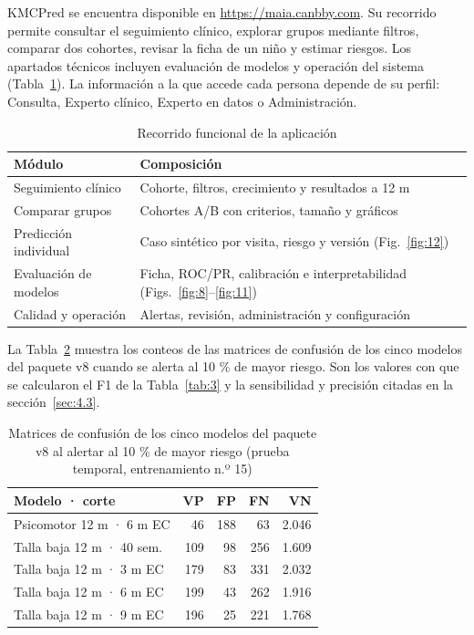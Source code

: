 KMCPred se encuentra disponible en \url{https://maia.canbby.com}. Su recorrido permite consultar el seguimiento clínico, explorar grupos mediante filtros, comparar dos cohortes, revisar la ficha de un niño y estimar riesgos. Los apartados técnicos incluyen evaluación de modelos y operación del sistema (Tabla~\ref{tab:6}). La información a la que accede cada persona depende de su perfil: Consulta, Experto clínico, Experto en datos o Administración.

\begin{table}[t]
\centering
\caption{Recorrido funcional de la aplicación}
\label{tab:6}
\footnotesize
\setlength{\tabcolsep}{2pt}
\begin{tabular}{@{}p{}p{}@{}}
\toprule
\textbf{Módulo} & \textbf{Composición} \\
\midrule
Seguimiento clínico & Cohorte, filtros, crecimiento y resultados a 12 m \\
Comparar grupos & Cohortes A/B con criterios, tamaño y gráficos \\
Predicción individual & Caso sintético por visita, riesgo y versión (Fig.~\ref{fig:12}) \\
Evaluación de modelos & Ficha, ROC/PR, calibración e interpretabilidad (Figs.~\ref{fig:8}--\ref{fig:11}) \\
Calidad y operación & Alertas, revisión, administración y configuración \\
\bottomrule
\end{tabular}
\end{table}

La Tabla~\ref{tab:7} muestra los conteos de las matrices de confusión de los cinco modelos del paquete v8 cuando se alerta al 10 \% de mayor riesgo. Son los valores con que se calcularon el F1 de la Tabla~\ref{tab:3} y la sensibilidad y precisión citadas en la sección~\ref{sec:4.3}.

\begin{table}[t]
\centering
\caption{Matrices de confusión de los cinco modelos del paquete v8 al alertar al 10 \% de mayor riesgo (prueba temporal, entrenamiento n.º 15)}
\label{tab:7}
\footnotesize
\setlength{\tabcolsep}{2pt}
\begin{tabular}{@{}lrrrr@{}}
\toprule
\textbf{Modelo · corte} & \textbf{VP} & \textbf{FP} & \textbf{FN} & \textbf{VN} \\
\midrule
Psicomotor 12 m · 6 m EC & 46 & 188 & 63 & 2.046 \\
Talla baja 12 m · 40 sem. & 109 & 98 & 256 & 1.609 \\
Talla baja 12 m · 3 m EC & 179 & 83 & 331 & 2.032 \\
Talla baja 12 m · 6 m EC & 199 & 43 & 262 & 1.916 \\
Talla baja 12 m · 9 m EC & 196 & 25 & 221 & 1.768 \\
\bottomrule
\end{tabular}
\end{table}

